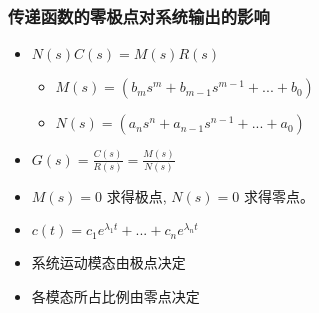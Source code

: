 \documentclass{beamer}
\begin{document}
\begin{frame}
\frametitle{传递函数的零极点对系统输出的影响}
\label{sec-2-5}

\begin{itemize}
\item <2-> $N(s)C(s)=M(s)R(s)$
\begin{itemize}
\item $M(s)=(b_m s^m+b_{m-1}s^{m-1}+...+b_0)$
\item $N(s)=(a_n s^n+a_{n-1}s^{n-1}+...+a_0)$
\end{itemize}
\item <3-> $G(s)=\frac{C(s)}{R(s)}=\frac{M(s)}{N(s)}$
\item <4-> $M(s)=0$ 求得极点, $N(s)=0$ 求得零点。
\item <5-> $c(t)=c_1e^{\lambda_1 t}+...+c_ne^{\lambda_n t}$
\item <6-> 系统运动模态由极点决定
\item <7-> 各模态所占比例由零点决定
\end{itemize}
\end{frame}
\end{document}
